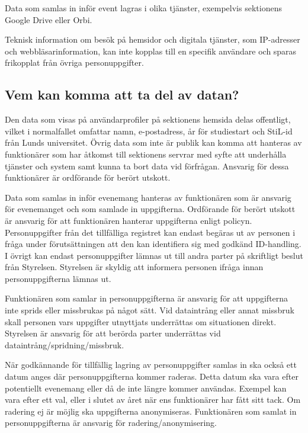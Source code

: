 \documentclass{dsekprotokoll}
\begin{document}
Data som samlas in inför event lagras i olika tjänster, exempelvis sektionens Google Drive eller Orbi.

Teknisk information om besök på hemsidor och digitala tjänster, som IP-adresser och webbläsarinformation, kan inte kopplas till en specifik användare och sparas frikopplat från övriga personuppgifter.

\subsection{Vem kan komma att ta del av datan?}

Den data som visas på användarprofiler på sektionens hemsida delas offentligt, vilket i normalfallet omfattar namn, e-postadress, år för studiestart och StiL-id från Lunds universitet.
Övrig data som inte är publik kan komma att hanteras av funktionärer som har åtkomst till
sektionens servrar med syfte att underhålla tjänster och system samt kunna ta bort data vid
förfrågan. Ansvarig för dessa funktionärer är ordförande för berört utskott.

Data som samlas in inför evenemang hanteras av funktionären som är ansvarig för evenemanget och som samlade in uppgifterna. Ordförande för berört utskott är ansvarig för att funktionären hanterar uppgifterna enligt policyn. Personuppgifter från det tillfälliga registret kan endast begäras ut av personen i fråga under förutsättningen att den kan identifiera sig med godkänd ID-handling. I övrigt kan endast personuppgifter lämnas ut till andra parter på skriftligt beslut från Styrelsen. Styrelsen är skyldig att informera personen ifråga innan personuppgifterna lämnas ut.

Funktionären som samlar in personuppgifterna är ansvarig för att uppgifterna inte sprids eller missbrukas på något sätt. Vid dataintrång eller annat missbruk skall personen vars uppgifter utnyttjats underrättas om situationen direkt. Styrelsen är ansvarig för att berörda parter underrättas vid dataintrång/spridning/missbruk.

När godkännande för tillfällig lagring av personuppgifter samlas in ska också ett datum anges där personuppgifterna kommer raderas. Detta datum ska vara efter potentiellt evenemang eller då de inte längre kommer användas. Exempel kan vara efter ett val, eller i slutet av året när ens funktionärer har fått sitt tack. Om radering ej är möjlig ska
uppgifterna anonymiseras. Funktionären som samlat in personuppgifterna är ansvarig för radering/anonymisering.
\end{document}
